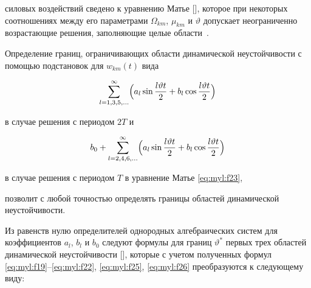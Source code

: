 силовых воздействий сведено к уравнению Матье [], которое при некоторых соотношениях между его параметрами $\Omega_{km}$, $\mu_{km}$  и $\vartheta$ допускает неограниченно возрастающие решения, заполняющие целые области~\cite{mylpolbel:bib:Bolotin}.



Определение границ, ограничивающих области динамической неустойчивости с помощью подстановок  для $w_{km}(t)$ вида 

\begin{equation*}

    \sum_{l=1,3,5,\dots}^{\infty}

    \Bigl(a_l \sin\frac{l \vartheta t}{2}+b_l \cos\frac{l \vartheta t}{2}\Bigr) 

\end{equation*}

в случае решения с периодом $2 T$ и

\begin{equation*}

b_0+\sum_{l=2,4,6,\dots}^{\infty}

\Bigl(

a_l \sin\frac{l \vartheta t}{2}+b_l \cos\frac{l \vartheta t}{2}\Bigr) 

\end{equation*}

в случае решения с периодом $T$ \cite{mylpolbel:bib:Bolotin}  в уравнение Матье \eqref{eq:myl:f23},  

позволит с любой точностью определять границы областей динамической неустойчивости. 

Из равенств нулю определителей однородных алгебраических систем для коэффициентов $a_l$, $b_l$ и $b_0$ следуют формулы для границ $\vartheta^*$ первых трех областей динамической неустойчивости [], которые с учетом полученных формул \eqref{eq:myl:f19}--\eqref{eq:myl:f22}, \eqref{eq:myl:f25}, \eqref{eq:myl:f26} преобразуются к следующему виду:




